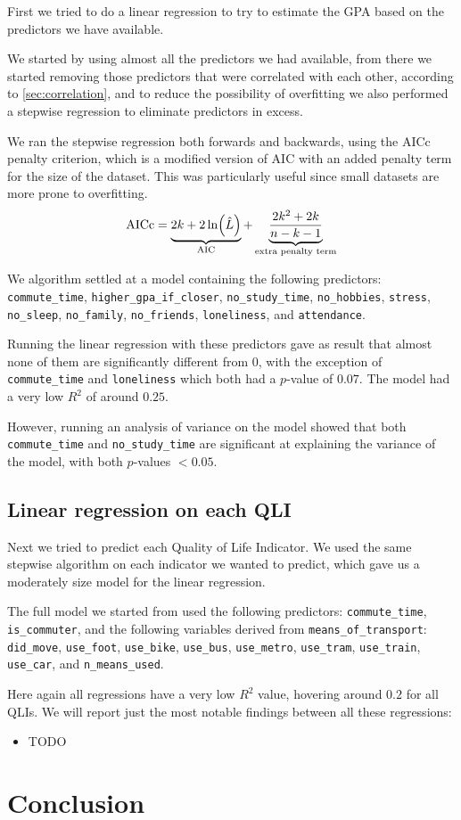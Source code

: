 \documentclass[11pt]{extarticle}
\numberwithin{table}{section}
\numberwithin{figure}{section}
\numberwithin{equation}{section}
\begin{document}
First we tried to do a linear regression to try to estimate the GPA
based on the predictors we have available.

We started by using almost all the predictors we had available,
from there we started removing those predictors that were correlated with each other,
according to \cref{sec:correlation}, and to reduce the possibility of overfitting
we also performed a stepwise regression to eliminate predictors in excess.

We ran the stepwise regression both forwards and backwards,
using the AICc penalty criterion, which is a modified version of AIC with an added penalty term
for the size of the dataset.
This was particularly useful since small datasets are more prone to overfitting.
\begin{equation}
	{\operatorfont AICc} =
	\underbrace{2k + 2 \ln (\hat L)}_{\operatorfont AIC}
	+ \underbrace{\frac {2k^{2}+2k}{n-k-1}}_{\text{extra penalty term}}
\end{equation}

We algorithm settled at a model containing the following predictors:
\texttt{commute\_time},
\texttt{higher\_gpa\_if\_closer},
\texttt{no\_study\_time},
\texttt{no\_hobbies},
\texttt{stress},
\texttt{no\_sleep},
\texttt{no\_family},
\texttt{no\_friends},
\texttt{loneliness}, and
\texttt{attendance}.

Running the linear regression with these predictors gave as result that almost none of them
are significantly different from $0$, with the exception of
\texttt{commute\_time} and \texttt{loneliness} which both had a $p$-value of $0.07$.
The model had a very low $R^2$ of around $0.25$.

However, running an analysis of variance on the model showed that both
\texttt{commute\_time} and \texttt{no\_study\_time} are significant
at explaining the variance of the model, with both $p$-values $<0.05$.

\subsection{Linear regression on each QLI}

Next we tried to predict each Quality of Life Indicator.
We used the same stepwise algorithm on each indicator we wanted to predict,
which gave us a moderately size model for the linear regression.

The full model we started from used the following predictors:
\texttt{commute\_time},
\texttt{is\_commuter}, and the following variables derived from \texttt{means\_of\_transport}:
\texttt{did\_move},
\texttt{use\_foot},
\texttt{use\_bike},
\texttt{use\_bus},
\texttt{use\_metro},
\texttt{use\_tram},
\texttt{use\_train},
\texttt{use\_car}, and
\texttt{n\_means\_used}.

Here again all regressions have a very low $R^2$ value, hovering around $0.2$ for all QLIs.
We will report just the most notable findings between all these regressions:
\begin{itemize}
	\item TODO
\end{itemize}

\section{Conclusion}
\end{document}
